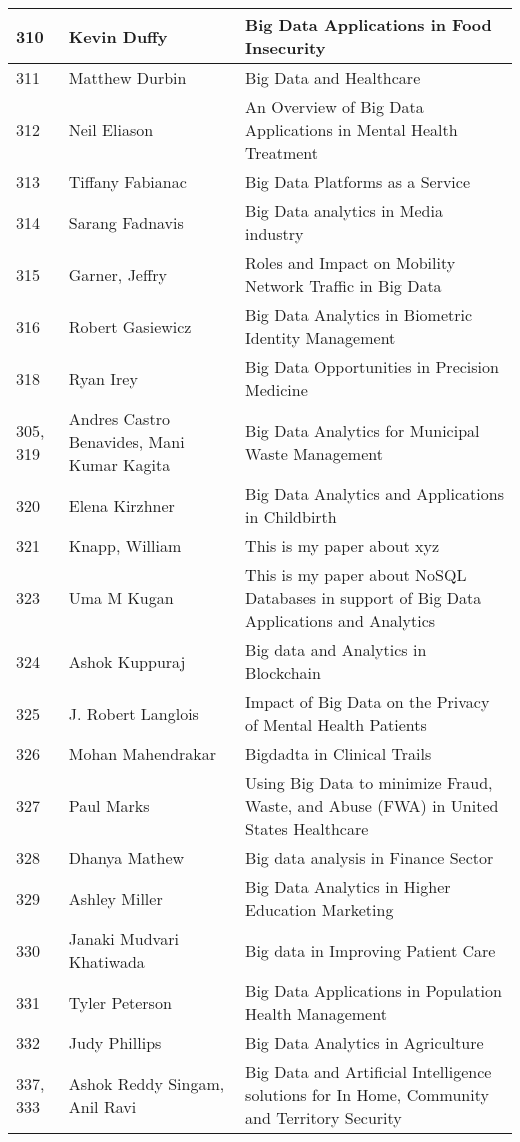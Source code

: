 \documentclass[12pt]{book}
\begin{document}
\begin{footnotesize}
\begin{longtable}{|p{1cm}p{5cm}p{9cm}|}
\hline
310 & Kevin Duffy & Big Data Applications in Food Insecurity  \\
\hline
311 & Matthew Durbin & Big Data and Healthcare  \\
\hline
312 & Neil Eliason & An Overview of Big Data Applications in Mental Health Treatment  \\
\hline
313 & Tiffany Fabianac & Big Data Platforms as a Service  \\
\hline
314 & Sarang Fadnavis & Big Data analytics in Media industry  \\
\hline
315 & Garner, Jeffry & Roles and Impact on Mobility Network Traffic in Big Data  \\
\hline
316 & Robert Gasiewicz & Big Data Analytics in Biometric Identity Management  \\
\hline
318 & Ryan Irey & Big Data Opportunities in Precision Medicine  \\
\hline
305, 319 & Andres Castro Benavides, Mani Kumar Kagita & Big Data Analytics for Municipal Waste Management  \\
\hline
320 & Elena Kirzhner & Big Data Analytics and Applications in Childbirth  \\
\hline
321 & Knapp, William & This is my paper about xyz  \\
\hline
323 & Uma M Kugan & This is my paper about NoSQL Databases in support of Big Data Applications and Analytics  \\
\hline
324 & Ashok Kuppuraj & Big data and Analytics in Blockchain  \\
\hline
325 & J. Robert Langlois & Impact of Big Data on the Privacy of Mental Health Patients  \\
\hline
326 & Mohan Mahendrakar & Bigdadta in Clinical Trails  \\
\hline
327 & Paul Marks & Using Big Data to minimize Fraud, Waste, and Abuse (FWA) in United States Healthcare  \\
\hline
328 & Dhanya Mathew & Big data analysis in Finance Sector  \\
\hline
329 & Ashley Miller & Big Data Analytics in Higher Education Marketing  \\
\hline
330 & Janaki Mudvari Khatiwada & Big data in Improving Patient Care  \\
\hline
331 & Tyler Peterson & Big Data Applications in Population Health Management  \\
\hline
332 & Judy Phillips & Big Data Analytics in Agriculture  \\
\hline
337, 333 & Ashok Reddy Singam, Anil Ravi & Big Data and Artificial Intelligence solutions for In Home, Community and Territory Security  \\

\end{longtable}
\end{footnotesize}
\end{document}
